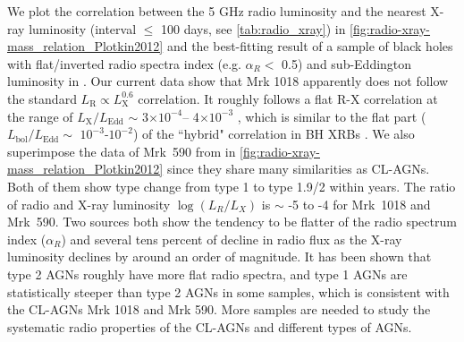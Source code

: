 \documentclass[twocolumn]{aastex63}
\begin{document}
We plot the correlation between the 5 GHz radio luminosity and the nearest X-ray luminosity (interval $\le$ 100 days, see \autoref{tab:radio_xray}) in \autoref{fig:radio-xray-mass_relation_Plotkin2012} and the best-fitting result of a sample of black holes with flat/inverted radio spectra index (e.g. $\alpha_R <$ 0.5) and sub-Eddington luminosity in \citet{2012MNRAS.419..267P}. Our current data show that Mrk 1018 apparently does not follow the standard $L_\mathrm{R}\propto L_\mathrm{X}^{0.6}$ correlation. It roughly follows a flat R-X correlation at the range of $L_\mathrm{X}/L_\mathrm{Edd}$ $\sim$ 3$\times 10^{-4}$-- 4$\times 10^{-3}$ , which is similar to the flat part ($L_\mathrm{bol}/L_\mathrm{Edd} \sim$ $10^{-3}$-$10^{-2}$) of the ``hybrid" correlation in BH XRBs \citep[see e.g.][]{2018MNRAS.473.4122E,2020ApJ...891...31X}. We also superimpose the data of Mrk~590 from \citet[][]{2016MNRAS.460..304K} in \autoref{fig:radio-xray-mass_relation_Plotkin2012} since they share many similarities as CL-AGNs. Both of them show type change from type 1 to type 1.9/2 within years. The ratio of radio and X-ray luminosity $\log(L_R/L_X)$ is $\sim$ -5 to -4 for Mrk~1018 and Mrk~590. Two sources both show the tendency to be flatter of the radio spectrum index ($\alpha_R$) and several tens percent of decline in radio flux as the X-ray luminosity declines by around an order of magnitude. It has been shown that type 2 AGNs roughly have more flat radio spectra, and type 1 AGNs are statistically steeper than type 2 AGNs in some samples\citep[e.g.][]{2019MNRAS.485.3185C}, which is consistent with the CL-AGNs Mrk 1018 and Mrk 590.  More samples are needed to study the systematic radio properties of the CL-AGNs and different types of AGNs.
\end{document}
